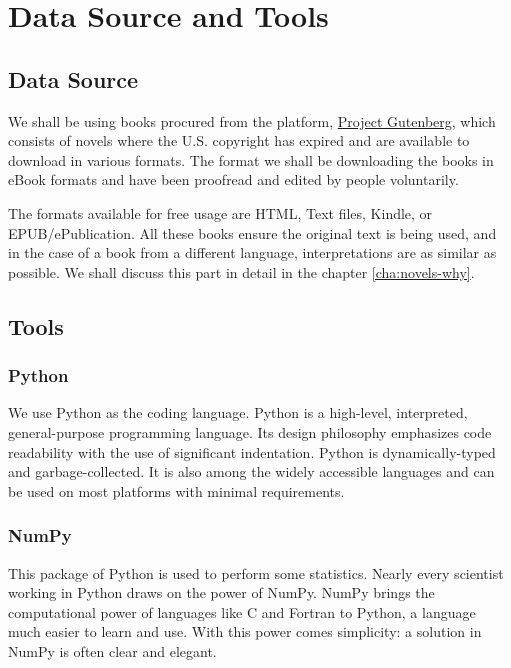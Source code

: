 \section{Data Source and Tools}
\label{sec:data-source-tools}

\subsection{Data Source}
\label{sec:data-source-intro}

We shall be using books procured from the platform, \href{https://www.gutenberg.org/}{Project Gutenberg}, which consists of novels where the U.S. copyright has expired and are available to download in various formats. The format we shall be downloading the books in eBook formats and have been proofread and edited by people voluntarily. 

The formats available for free usage are HTML, Text files, Kindle, or EPUB/ePublication. All these books ensure the original text is being used, and in the case of a book from a different language, interpretations are as similar as possible. We shall discuss this part in detail in the chapter \ref{cha:novels-why}.

\subsection{Tools}
\label{sec:python-tools}

\subsubsection{Python}

We use Python as the coding language. Python is a high-level, interpreted, general-purpose programming language. Its design philosophy emphasizes code readability with the use of significant indentation. Python is dynamically-typed and garbage-collected. It is also among the widely accessible languages and can be used on most platforms with minimal requirements. 

\subsubsection{NumPy}

This package of Python is used to perform some statistics. Nearly every scientist working in Python draws on the power of NumPy. NumPy brings the computational power of languages like C and Fortran to Python, a language much easier to learn and use. With this power comes simplicity: a solution in NumPy is often clear and elegant.

